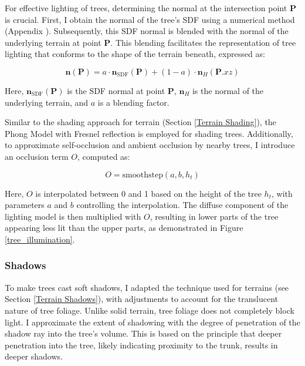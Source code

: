 For effective lighting of trees, determining the normal at the intersection point $\mathbf{P}$ is crucial. First, I obtain the normal of the tree's SDF using a numerical method (Appendix ). Subsequently, this SDF normal is blended with the normal of the underlying terrain at point $\mathbf{P}$. This blending facilitates the representation of tree lighting that conforms to the shape of the terrain beneath, expressed as:

\begin{equation}
    \mathbf{n}(\mathbf{P}) = a \cdot \mathbf{n}_{\text{SDF}}(\mathbf{P}) + (1 - a) \cdot \mathbf{n}_H(\mathbf{P}.xz)
\end{equation}

Here, $\mathbf{n}_{\text{SDF}}(\mathbf{P})$ is the SDF normal at point $\mathbf{P}$, $\mathbf{n}_H$ is the normal of the underlying terrain, and $a$ is a blending factor.

Similar to the shading approach for terrain (Section \ref{Terrain Shading}), the Phong Model with Fresnel reflection is employed for shading trees. Additionally, to approximate self-occlusion and ambient occlusion by nearby trees, I introduce an occlusion term $O$, computed as:

\begin{equation}
O = \text{smoothstep}(a, b, h_t)
\end{equation}

Here, $O$ is interpolated between 0 and 1 based on the height of the tree $h_t$, with parameters $a$ and $b$ controlling the interpolation. The diffuse component of the lighting model is then multiplied with $O$, resulting in lower parts of the tree appearing less lit than the upper parts, as demonstrated in Figure \ref{tree_illumination}.

\subsubsection{Shadows}
\label{Tree Shadows}

To make trees cast soft shadows, I adapted the technique used for terrains (see Section \ref{Terrain Shadows}), with adjustments to account for the translucent nature of tree foliage. Unlike solid terrain, tree foliage does not completely block light. I approximate the extent of shadowing with the degree of penetration of the shadow ray into the tree's volume. This is based on the principle that deeper penetration into the tree, likely indicating proximity to the trunk, results in deeper shadows.

